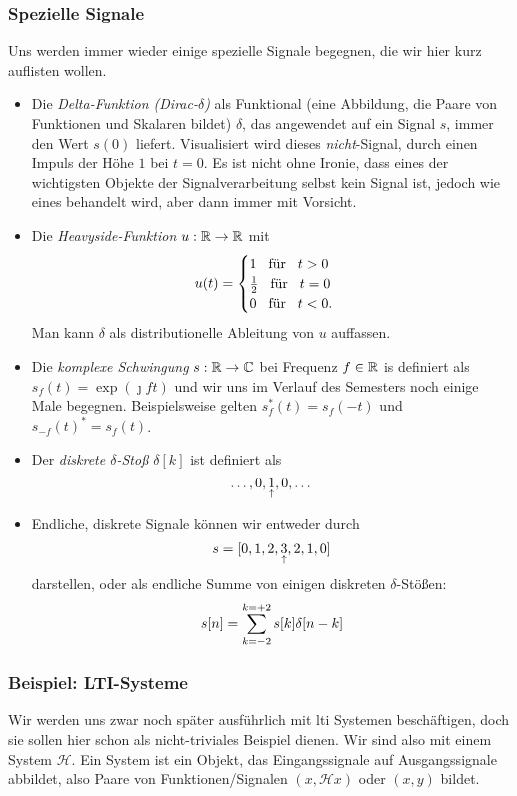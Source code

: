 \subsubsection{Spezielle Signale}\label{sec:spec_sig}
%
Uns werden immer wieder einige spezielle Signale begegnen, die wir hier kurz auflisten wollen.
\begin{itemize}
    \item Die \emph{Delta-Funktion (Dirac-$\delta$)} als Funktional (eine Abbildung, die Paare von Funktionen und Skalaren bildet) $\delta$, das angewendet auf ein Signal $s$, immer den Wert $s(0)$ liefert. 
    Visualisiert wird dieses \emph{nicht}-Signal, durch einen Impuls der Höhe $1$ bei $t = 0$. 
    Es ist nicht ohne Ironie, dass eines der wichtigsten Objekte der Signalverarbeitung selbst kein Signal ist, jedoch wie eines behandelt wird, aber dann immer mit Vorsicht.
    \item Die \emph{Heavyside-Funktion} $u : \mathbb{R} \rightarrow \mathbb{R}$ mit
    \[
        u(t) = \begin{cases}
            1 {\hspace{3mm} \text{für} \hspace{3mm}} t>0 \\
            \frac{1}{2} {\hspace{3mm} \text{für} \hspace{3mm}} t = 0 \\
            0 {\hspace{3mm} \text{für} \hspace{3mm}} t < 0.
        \end{cases}
    \]
    Man kann $\delta$ als distributionelle Ableitung von $u$ auffassen.
    \item Die \emph{komplexe Schwingung} $s : \mathbb{R} \rightarrow \mathbb{C}$ bei Frequenz $f \in \mathbb{R}$ is definiert als 
        $s_f(t) = \exp(\jmath f t)$
    und wir uns im Verlauf des Semesters noch einige Male begegnen. 
    Beispielsweise gelten $s_f^\ast(t) = s_f(-t)$ und $s_{-f}(t)^\ast = s_f(t)$.
    \item Der \emph{diskrete $\delta$-Stoß} $\delta[k]$ ist definiert als
    \[\dots, 0, \underset{\uparrow}{1}, 0, \dots\]
    \item Endliche, diskrete Signale können wir entweder durch
    \[
        s = [0,1,2,\underset{\uparrow}{3},2,1,0]
    \]
    darstellen, oder als endliche Summe von einigen diskreten $\delta$-Stößen:
    \[
        s[n] = {\sum\limits_{k=-2}^{k=+2}{s}}[k] \delta[n - k]
    \]
\end{itemize}
%
%
\subsubsection{Beispiel: LTI-Systeme}\label{exm:basics:cont_lit}
Wir werden uns zwar noch später ausführlich mit \gls{lti} Systemen beschäftigen, doch sie sollen hier schon als nicht-triviales Beispiel dienen.
Wir sind also mit einem System $\mathcal{H}$.
Ein System ist ein Objekt, das Eingangssignale auf Ausgangssignale abbildet, also Paare von Funktionen/Signalen $(x, \mathcal{H}x)$ oder $(x, y)$ bildet.

